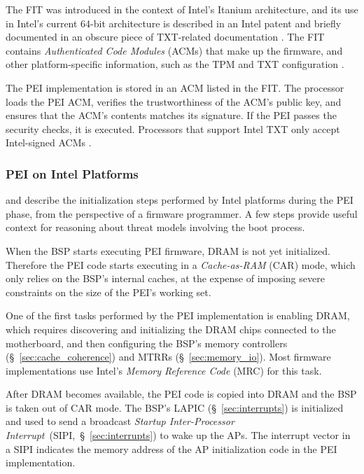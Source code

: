 The FIT \cite{qureshi2006fit} was introduced in the context of Intel's Itanium
architecture, and its use in Intel's current 64-bit architecture is described
in an Intel patent \cite{datta2013acm} and briefly documented in an obscure
piece of TXT-related documentation \cite{intel2010txtlab}. The FIT contains
\textit{Authenticated Code Modules} (ACMs) that make up the firmware, and
other platform-specific information, such as the TPM and TXT configuration
\cite{intel2010txtlab}.

The PEI implementation is stored in an ACM listed in the FIT. The processor
loads the PEI ACM, verifies the trustworthiness of the ACM's public key, and
ensures that the ACM's contents matches its signature. If the PEI passes the
security checks, it is executed. Processors that support Intel TXT only accept
Intel-signed ACMs \cite[p. 92]{futral2013servertxt}.


\subsubsection{PEI on Intel Platforms}
\label{sec:uefi_pei_details}

\cite{intel2010booting} and \cite{coreboot2015manual} describe the
initialization steps performed by Intel platforms during the PEI phase, from
the perspective of a firmware programmer. A few steps provide useful context
for reasoning about threat models involving the boot process.


When the BSP starts executing PEI firmware, DRAM is not yet initialized.
Therefore the PEI code starts executing in a \textit{Cache-as-RAM} (CAR) mode,
which only relies on the BSP's internal caches, at the expense of imposing
severe constraints on the size of the PEI's working set.

One of the first tasks performed by the PEI implementation is enabling DRAM,
which requires discovering and initializing the DRAM chips connected to the
motherboard, and then configuring the BSP's memory controllers
(\S~\ref{sec:cache_coherence}) and MTRRs (\S~\ref{sec:memory_io}). Most
firmware implementations use Intel's \textit{Memory Reference Code} (MRC) for
this task.

After DRAM becomes available, the PEI code is copied into DRAM and the BSP is
taken out of CAR mode. The BSP's LAPIC (\S~\ref{sec:interrupts}) is initialized
and used to send a broadcast
\textit{Startup Inter-Processor Interrupt}~(SIPI,~\S~\ref{sec:interrupts})
to wake up the APs. The interrupt vector in a SIPI indicates the memory address
of the AP initialization code in the PEI implementation.

